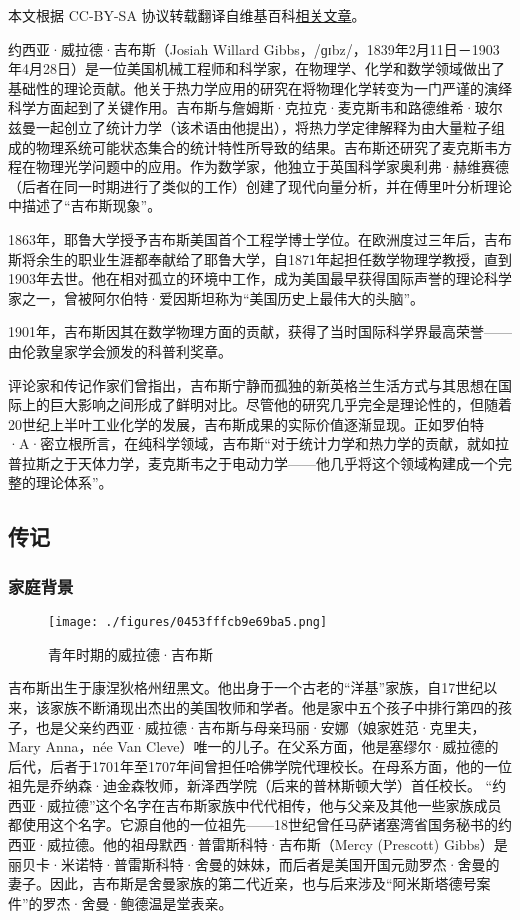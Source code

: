 
本文根据 CC-BY-SA 协议转载翻译自维基百科\href{https://en.wikipedia.org/wiki/Josiah_Willard_Gibbs}{相关文章}。

约西亚·威拉德·吉布斯（Josiah Willard Gibbs，/ɡɪbz/，1839年2月11日－1903年4月28日）是一位美国机械工程师和科学家，在物理学、化学和数学领域做出了基础性的理论贡献。他关于热力学应用的研究在将物理化学转变为一门严谨的演绎科学方面起到了关键作用。吉布斯与詹姆斯·克拉克·麦克斯韦和路德维希·玻尔兹曼一起创立了统计力学（该术语由他提出），将热力学定律解释为由大量粒子组成的物理系统可能状态集合的统计特性所导致的结果。吉布斯还研究了麦克斯韦方程在物理光学问题中的应用。作为数学家，他独立于英国科学家奥利弗·赫维赛德（后者在同一时期进行了类似的工作）创建了现代向量分析，并在傅里叶分析理论中描述了“吉布斯现象”。

1863年，耶鲁大学授予吉布斯美国首个工程学博士学位。在欧洲度过三年后，吉布斯将余生的职业生涯都奉献给了耶鲁大学，自1871年起担任数学物理学教授，直到1903年去世。他在相对孤立的环境中工作，成为美国最早获得国际声誉的理论科学家之一，曾被阿尔伯特·爱因斯坦称为“美国历史上最伟大的头脑”。

1901年，吉布斯因其在数学物理方面的贡献，获得了当时国际科学界最高荣誉——由伦敦皇家学会颁发的科普利奖章。

评论家和传记作家们曾指出，吉布斯宁静而孤独的新英格兰生活方式与其思想在国际上的巨大影响之间形成了鲜明对比。尽管他的研究几乎完全是理论性的，但随着20世纪上半叶工业化学的发展，吉布斯成果的实际价值逐渐显现。正如罗伯特·A·密立根所言，在纯科学领域，吉布斯“对于统计力学和热力学的贡献，就如拉普拉斯之于天体力学，麦克斯韦之于电动力学——他几乎将这个领域构建成一个完整的理论体系”。
\subsection{传记}
\subsubsection{家庭背景}
\begin{figure}[ht]
\centering
\texttt{[image: ./figures/0453fffcb9e69ba5.png]}
\caption{青年时期的威拉德·吉布斯} \label{fig_QSY_1}
\end{figure}
吉布斯出生于康涅狄格州纽黑文。他出身于一个古老的“洋基”家族，自17世纪以来，该家族不断涌现出杰出的美国牧师和学者。他是家中五个孩子中排行第四的孩子，也是父亲约西亚·威拉德·吉布斯与母亲玛丽·安娜（娘家姓范·克里夫，Mary Anna，née Van Cleve）唯一的儿子。在父系方面，他是塞缪尔·威拉德的后代，后者于1701年至1707年间曾担任哈佛学院代理校长。在母系方面，他的一位祖先是乔纳森·迪金森牧师，新泽西学院（后来的普林斯顿大学）首任校长。
“约西亚·威拉德”这个名字在吉布斯家族中代代相传，他与父亲及其他一些家族成员都使用这个名字。它源自他的一位祖先——18世纪曾任马萨诸塞湾省国务秘书的约西亚·威拉德。他的祖母默西·普雷斯科特·吉布斯（Mercy (Prescott) Gibbs）是丽贝卡·米诺特·普雷斯科特·舍曼的妹妹，而后者是美国开国元勋罗杰·舍曼的妻子。因此，吉布斯是舍曼家族的第二代近亲，也与后来涉及“阿米斯塔德号案件”的罗杰·舍曼·鲍德温是堂表亲。

